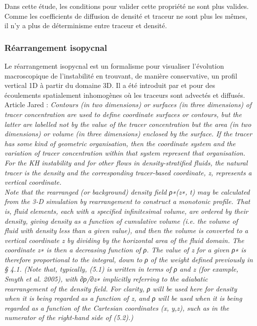 \documentclass[a4paper,12pt]{article}
\begin{document}
        Dans cette étude, les conditions pour valider cette propriété ne sont plus valides. Comme les coefficients de diffusion de densité et traceur ne sont plus les mêmes, il n'y a plus de déterminisme entre traceur et densité.
    
    
        \subsubsection{Réarrangement isopycnal}
        
        Le réarrangement isopycnal est un formalisme pour visualiser l'évolution macroscopique de l'instabilité en trouvant, de manière conservative, un profil vertical 1D à partir du domaine 3D. Il a été introduit par \citep{nakamura_two-dimensional_1996} et \citep*{winters_diascalar_1996} pour des écoulements spatialement inhomogènes où les traceurs sont advectés et diffusés. \\
        \newline
        Article Jared : \textit{Contours (in two dimensions) or surfaces (in three dimensions) of tracer concentration are used to define coordinate surfaces or contours, but the latter are labelled not by the value of the tracer concentration but the area (in two dimensions) or volume (in three dimensions) enclosed by the surface. If the tracer has some kind of geometric organisation, then the coordinate system and the variation of tracer concentration within that system represent that organisation. For the KH instability and for other flows in density-stratified fluids, the natural tracer is the density and the corresponding tracer-based coordinate, z\∗, represents a vertical coordinate. \\
        Note that the rearranged (or background) density field ρ∗(z∗, t) may be calculated from the 3-D simulation by rearrangement to construct a monotonic profile. That is, fluid elements, each with a specified infinitesimal volume, are ordered by their density, giving density as a function of cumulative volume (i.e. the volume of fluid with density less than a given value), and then the volume is converted to a vertical coordinate z\∗ by dividing by the horizontal area of the fluid domain. The coordinate z∗ is then a decreasing function of ρ\∗. The value of z\∗ for a given ρ∗ is therefore proportional to the integral, down to ρ\∗ of the weight defined previously in § 4.1. (Note that, typically, (5.1) is written in terms of ρ and z\∗ (for example, Smyth et al. 2005), with ∂ρ/∂z∗ implicitly referring to the adiabatic rearrangement of the density field. For clarity, ρ\∗ will be used here for density when it is being regarded as a function of z\∗, and ρ will be used when it is being regarded as a function of the Cartesian coordinates (x, y,z), such as in the numerator of the right-hand side of (5.2).)}
\end{document}
